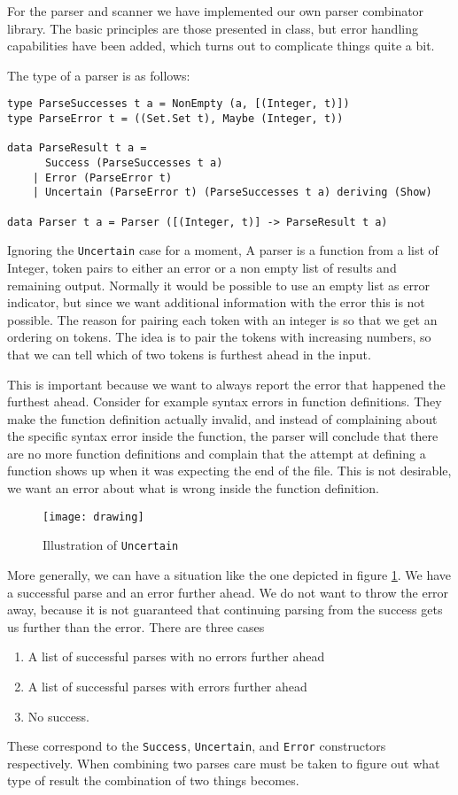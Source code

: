 \documentclass{scrartcl}
\begin{document}
For the parser and scanner we have implemented our own parser combinator
library. The basic principles are those presented in class, but error
handling capabilities have been added, which turns out to complicate
things quite a bit.

The type of a parser is as follows:
\begin{lstlisting}
type ParseSuccesses t a = NonEmpty (a, [(Integer, t)])
type ParseError t = ((Set.Set t), Maybe (Integer, t))

data ParseResult t a = 
      Success (ParseSuccesses t a)
    | Error (ParseError t)
    | Uncertain (ParseError t) (ParseSuccesses t a) deriving (Show)

data Parser t a = Parser ([(Integer, t)] -> ParseResult t a)
\end{lstlisting}
Ignoring the \lstinline{Uncertain} case for a moment,
A parser is a function from a list of Integer, token pairs to either
an error or a non empty list of results and remaining output.
Normally it would be possible to use an empty list as error indicator,
but since we want additional information with the error this is not
possible. The reason for pairing each token with an integer is so that
we get an ordering on tokens. The idea is to pair the tokens with 
increasing numbers, so that we can tell which of two tokens is furthest
ahead in the input.

This is important because we want to always report the error that
happened the furthest ahead. Consider for example 
syntax errors in function definitions.
They make the function definition actually invalid,
and instead of complaining about the specific syntax error inside the
function, the parser will conclude that there are no more function
definitions and complain that the attempt at defining a function
shows up when it was expecting the end of the file. This is not
desirable, we want an error about what is wrong inside the function
definition.

\begin{figure}
\centering
\texttt{[image: drawing]}
\caption{Illustration of \lstinline{Uncertain}}
\label{fig:uncertain}
\end{figure}

More generally, we can have a situation like the one depicted in 
figure \ref{fig:uncertain}. We have a successful parse and an error
further ahead. We do not want to throw the error away, because it is
not guaranteed that continuing parsing from the success gets us further
than the error. There are three cases
\begin{enumerate}
\item A list of successful parses with no errors further ahead
\item A list of successful parses with errors further ahead
\item No success.
\end{enumerate}
These correspond to the \lstinline{Success}, \lstinline{Uncertain}, and 
\lstinline{Error} constructors respectively. When combining two parses
care must be taken to figure out what type of result the combination
of two things becomes.
\end{document}
